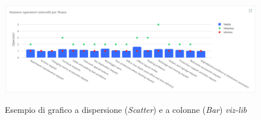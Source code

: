 \begin{figure}[H]
    \centering
    \includegraphics[alt={Esempio di grafico con a dispersione (Scatter) e colonne viz-lib}, width=1 \columnwidth, height=\maxdimen, keepaspectratio]{img/ex_scatter_bar.png}
    \caption{Esempio di grafico a dispersione (\textit{Scatter}) e a colonne (\textit{Bar}) \textit{viz-lib}}
    \label{fig:scatter-example}
\end{figure}

